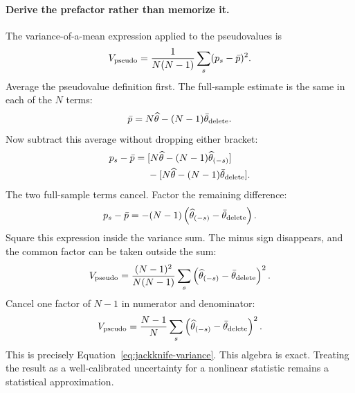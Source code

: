 \documentclass[11pt]{article}
\begin{document}
\paragraph{Derive the prefactor rather than memorize it.}
The variance-of-a-mean expression applied to the pseudovalues is
\begin{equation}
 V_{\rm pseudo}=\frac1{N(N-1)}\sum_s(p_s-\bar p)^2.
\end{equation}
Average the pseudovalue definition first. The full-sample estimate
is the same in each of the $N$ terms:
\begin{equation}
 \bar p=N\widehat\theta-(N-1)\bar\theta_{\rm delete}.
\end{equation}
Now subtract this average without dropping either bracket:
\begin{equation}
 \begin{split}
 p_s-\bar p={}&[N\widehat\theta-(N-1)\widehat\theta_{(-s)}]\\
 &-[N\widehat\theta-(N-1)\bar\theta_{\rm delete}].
 \end{split}
\end{equation}
The two full-sample terms cancel. Factor the remaining difference:
\begin{equation}
 p_s-\bar p=-(N-1)
 \left(\widehat\theta_{(-s)}-\bar\theta_{\rm delete}\right).
\end{equation}
Square this expression inside the variance sum. The minus sign disappears,
and the common factor can be taken outside the sum:
\begin{equation}
 V_{\rm pseudo}=\frac{(N-1)^2}{N(N-1)}\sum_s
 \left(\widehat\theta_{(-s)}-\bar\theta_{\rm delete}\right)^2.
\end{equation}
Cancel one factor of $N-1$ in numerator and denominator:
\begin{equation}
 V_{\rm pseudo}=\frac{N-1}{N}\sum_s
 \left(\widehat\theta_{(-s)}-\bar\theta_{\rm delete}\right)^2.
\end{equation}
This is precisely Equation~\eqref{eq:jackknife-variance}.
This algebra is exact. Treating the result as a well-calibrated uncertainty
for a nonlinear statistic remains a statistical approximation.
\end{document}
